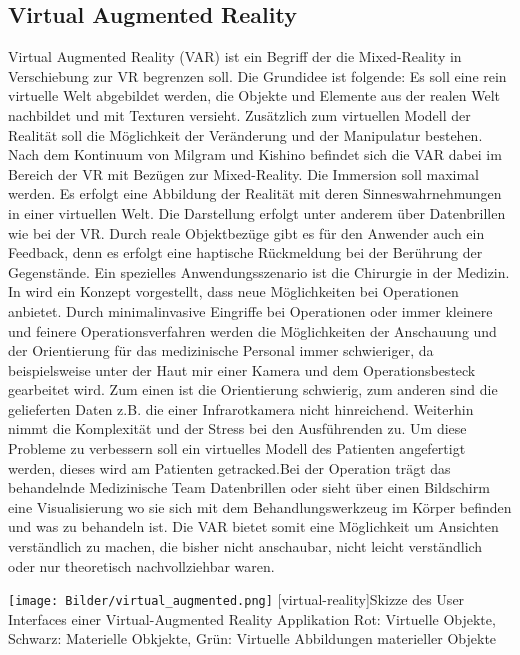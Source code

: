 \documentclass[12pt,a4paper,bibliography=totocnumbered,listof=totocnumbered]{scrartcl}
\begin{document}
\subsection{Virtual Augmented Reality}
Virtual Augmented Reality (\ac{VAR}) ist ein Begriff der die Mixed-Reality in Verschiebung zur VR begrenzen soll. Die Grundidee ist folgende: Es soll eine rein virtuelle Welt abgebildet werden, die Objekte und Elemente aus der realen Welt nachbildet und mit Texturen versieht. Zusätzlich zum virtuellen Modell der Realität soll die Möglichkeit der Veränderung und der Manipulatur bestehen. \newline
Nach dem Kontinuum von Milgram und Kishino befindet sich die VAR dabei im Bereich der VR mit Bezügen zur Mixed-Reality. Die Immersion soll maximal werden. Es erfolgt eine Abbildung der Realität mit deren Sinneswahrnehmungen in einer virtuellen Welt. Die Darstellung erfolgt unter anderem über Datenbrillen wie bei der VR. Durch reale Objektbezüge gibt es für den Anwender auch ein Feedback, denn es erfolgt eine haptische Rückmeldung bei der Berührung der Gegenstände. \newline
Ein spezielles Anwendungsszenario ist die Chirurgie in der Medizin. In \cite{OLMOS:2014aa} wird ein Konzept vorgestellt, dass neue Möglichkeiten bei Operationen anbietet. Durch minimalinvasive Eingriffe bei Operationen oder immer kleinere und feinere Operationsverfahren werden die Möglichkeiten der Anschauung und der Orientierung für das medizinische Personal immer schwieriger, da beispielsweise unter der Haut mir einer Kamera und dem Operationsbesteck gearbeitet wird. Zum einen ist die Orientierung schwierig, zum anderen sind die gelieferten Daten z.B. die einer Infrarotkamera nicht hinreichend. Weiterhin nimmt die Komplexität und der Stress bei den Ausführenden zu. Um diese Probleme zu verbessern soll ein virtuelles Modell des Patienten angefertigt werden, dieses wird am Patienten getracked.Bei der Operation trägt das behandelnde Medizinische Team Datenbrillen oder sieht über einen Bildschirm eine Visualisierung wo sie sich mit dem Behandlungswerkzeug im Körper befinden und was zu behandeln ist. \newline
Die VAR bietet somit eine Möglichkeit um Ansichten verständlich zu machen, die bisher nicht anschaubar, nicht leicht verständlich oder nur theoretisch nachvollziehbar waren.
\begin{minipage}{\linewidth}
\vspace{1em}
	\centering
	\texttt{[image: Bilder/virtual\_augmented.png]}
	[virtual-reality]{Skizze des User Interfaces einer Virtual-Augmented Reality Applikation\newline
	Rot: Virtuelle Objekte, Schwarz: Materielle Obkjekte, Grün: Virtuelle Abbildungen materieller Objekte}
	\label{fig:virtual_augmented_reality}
\vspace{1em}

\end{minipage}
\end{document}
